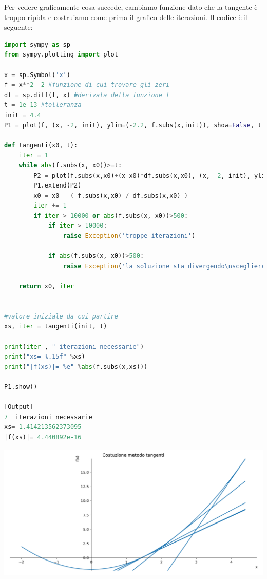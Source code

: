 \documentclass[10pt,a4paper]{article}
\begin{document}
Per vedere graficamente cosa succede, cambiamo funzione dato che la tangente è troppo ripida e costruiamo come prima il grafico delle iterazioni. Il codice è il seguente:
\begin{lstlisting}[language=Python]
import sympy as sp
from sympy.plotting import plot

x = sp.Symbol('x')
f = x**2 -2 #funzione di cui trovare gli zeri
df = sp.diff(f, x) #derivata della funzione f
t = 1e-13 #tolleranza
init = 4.4
P1 = plot(f, (x, -2, init), ylim=(-2.2, f.subs(x,init)), show=False, title='Costuzione metodo tangenti')

def tangenti(x0, t):
    iter = 1
    while abs(f.subs(x, x0))>=t:
        P2 = plot(f.subs(x,x0)+(x-x0)*df.subs(x,x0), (x, -2, init), ylim=(-2.2, f.subs(x,init)), show=False)
        P1.extend(P2)
        x0 = x0 - ( f.subs(x,x0) / df.subs(x,x0) )
        iter += 1
        if iter > 10000 or abs(f.subs(x, x0))>500:
            if iter > 10000:
                raise Exception('troppe iterazioni')

            if abs(f.subs(x, x0))>500:
                raise Exception('la soluzione sta divergendo\nscegliere meglio il punto di partenza')

    return x0, iter


#valore iniziale da cui partire
xs, iter = tangenti(init, t)

print(iter , " iterazioni necessarie")
print("xs= %.15f" %xs)
print("|f(xs)|= %e" %abs(f.subs(x,xs)))

P1.show()

[Output]
7  iterazioni necessarie
xs= 1.414213562373095
|f(xs)|= 4.440892e-16
\end{lstlisting}

\begin{center}
\includegraphics[scale=0.5]{img/co_tan.pdf}  
\end{center}
\end{document}
